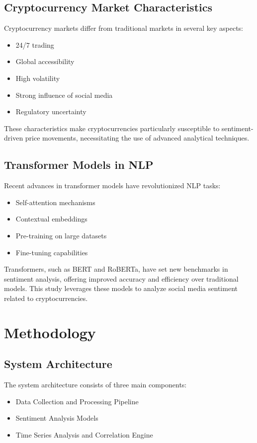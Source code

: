 \documentclass[12pt,a4paper]{report}
\begin{document}
\section{Cryptocurrency Market Characteristics}
Cryptocurrency markets differ from traditional markets in several key aspects:
\begin{itemize}
    \item 24/7 trading
    \item Global accessibility
    \item High volatility
    \item Strong influence of social media
    \item Regulatory uncertainty
\end{itemize}
These characteristics make cryptocurrencies particularly susceptible to sentiment-driven price movements, necessitating the use of advanced analytical techniques.

\section{Transformer Models in NLP}
Recent advances in transformer models have revolutionized NLP tasks:
\begin{itemize}
    \item Self-attention mechanisms
    \item Contextual embeddings
    \item Pre-training on large datasets
    \item Fine-tuning capabilities
\end{itemize}
Transformers, such as BERT and RoBERTa, have set new benchmarks in sentiment analysis, offering improved accuracy and efficiency over traditional models. This study leverages these models to analyze social media sentiment related to cryptocurrencies.

\chapter{Methodology}
\section{System Architecture}
The system architecture consists of three main components:

\begin{itemize}
    \item Data Collection and Processing Pipeline
    \item Sentiment Analysis Models
    \item Time Series Analysis and Correlation Engine
\end{itemize}
\end{document}
